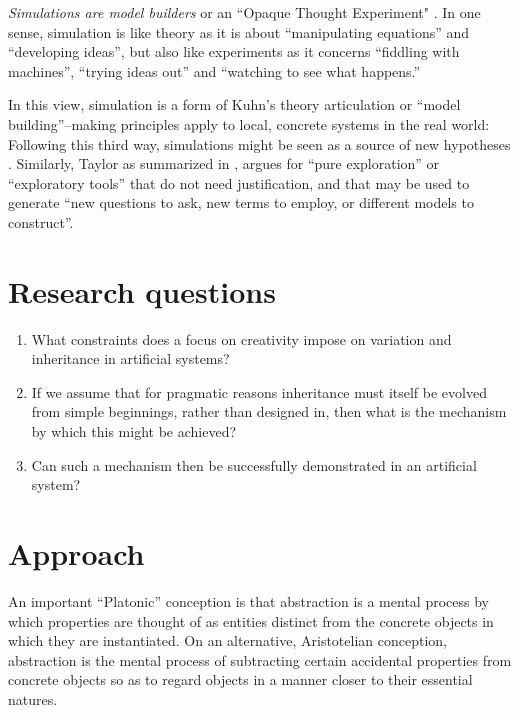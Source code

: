 \emph{Simulations are model builders} \textcite[31]{Winsberg2010} or an ``Opaque Thought Experiment" \parencite{DiPaolo2000}. In one sense, simulation is like theory as it is about ``manipulating equations'' and ``developing ideas'', but also like experiments as it concerns ``fiddling with machines'', ``trying ideas out'' and ``watching to see what happens.'' \parencite{Winsberg2010}

In this view, simulation is a form of Kuhn's theory articulation or ``model building''--making principles apply to local, concrete systems in the real world:  Following this third way, simulations might be seen as a source of new hypotheses \parencite{Eldridge}. Similarly, Taylor as summarized in \textcite{Webb2009}, argues for ``pure exploration'' or ``exploratory tools'' that do not need justification, and that may be used to generate ``new questions to ask, new terms to employ, or different models to construct''.

\section{Research questions}\label{research-questions}

\vspace{0.3cm}
\begin{minipage}[l]{0.95\textwidth}
	\begin{enumerate}[label=RQ\arabic*:]
	\item What constraints does a focus on creativity impose on variation and inheritance in artificial systems? 
	\item If we assume that for pragmatic reasons inheritance must itself be evolved from simple beginnings, rather than designed in, then what is the mechanism by which this might be achieved?
	\item Can such a mechanism then be successfully demonstrated in an artificial system?
	\end{enumerate}
\end{minipage}
\vspace{0.3cm}

\section{Approach}\label{approach}

\epigraph{%
An important ``Platonic'' conception is that abstraction is a mental process by which properties are thought of as entities distinct from the concrete objects in which they are instantiated. On an alternative, Aristotelian conception, abstraction is the mental process of subtracting certain accidental properties from concrete objects so as to regard objects in a manner closer to their essential natures.}%
{\textsc{\\\textcite{Griesemer2005}}}

